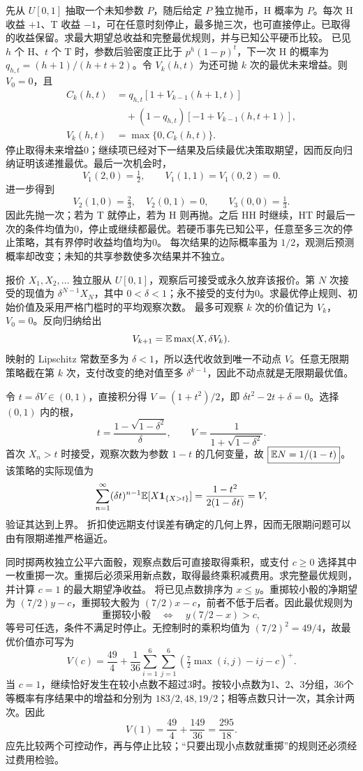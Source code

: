 先从 $U[0,1]$ 抽取一个未知参数 $P$，随后给定 $P$ 独立抛币，H 概率为 $P$。每次 H 收益 $+1$、T 收益 $-1$，可在任意时刻停止，最多抛三次，也可直接停止。已取得的收益保留。求最大期望总收益和完整最优规则，并与已知公平硬币比较。
\solution 已见 $h$ 个 H、$t$ 个 T 时，参数后验密度正比于 $p^h(1-p)^t$，下一次 H 的概率为 $q_{h,t}=(h+1)/(h+t+2)$。令 $V_k(h,t)$ 为还可抛 $k$ 次的最优未来增益。则 $V_0=0$，且
\[
 \begin{aligned}
 C_k(h,t)&=q_{h,t}[1+V_{k-1}(h+1,t)]\\
 &\quad +(1-q_{h,t})[-1+V_{k-1}(h,t+1)],\\
 V_k(h,t)&=\max\{0,C_k(h,t)\}.
 \end{aligned}
\]
停止取得未来增益0；继续项已经对下一结果及后续最优决策取期望，因而反向归纳证明该递推最优。最后一次机会时，
\[
 V_1(2,0)=\tfrac12,\qquad V_1(1,1)=V_1(0,2)=0.
\]
进一步得到
\[
 V_2(1,0)=\tfrac23,\quad V_2(0,1)=0,\qquad
 \boxed{V_3(0,0)=\tfrac13}.
\]
因此先抛一次；若为 T 就停止，若为 H 则再抛。之后 HH 时继续，HT 时最后一次的条件均值为0，停止或继续都最优。若硬币事先已知公平，任意至多三次的停止策略，其有界停时收益均值均为0。
\insight 每次结果的边际概率虽为 $1/2$，观测后预测概率却改变；未知的共享参数使多次结果并不独立。

报价 $X_1,X_2,\ldots$ 独立服从 $U[0,1]$，观察后可接受或永久放弃该报价。第 $N$ 次接受的现值为 $\delta^{N-1}X_N$，其中 $0<\delta<1$；永不接受的支付为0。求最优停止规则、初始价值及采用严格门槛时的平均观察次数。
\solution 最多可观察 $k$ 次的价值记为 $V_k$，$V_0=0$。反向归纳给出
\[
 V_{k+1}=\mathbb{E}\max(X,\delta V_k).
\]
映射的 Lipschitz 常数至多为 $\delta<1$，所以迭代收敛到唯一不动点 $V$。任意无限期策略截在第 $k$ 次，支付改变的绝对值至多 $\delta^{k-1}$，因此不动点就是无限期最优值。

令 $t=\delta V\in(0,1)$，直接积分得 $V=(1+t^2)/2$，即 $\delta t^2-2t+\delta=0$。选择 $(0,1)$ 内的根，
\[
 \boxed{t=\frac{1-\sqrt{1-\delta^2}}\delta},\qquad
 \boxed{V=\frac1{1+\sqrt{1-\delta^2}}}.
\]
首次 $X_n>t$ 时接受，观察次数为参数 $1-t$ 的几何变量，故 $\boxed{\mathbb{E} N=1/(1-t)}$。该策略的实际现值为
\[
 \sum_{n=1}^\infty(\delta t)^{n-1}\mathbb{E}[X\mathbf{1}_{\{X>t\}}]
 =\frac{1-t^2}{2(1-\delta t)}=V,
\]
验证其达到上界。
\insight 折扣使远期支付误差有确定的几何上界，因而无限期问题可以由有限期递推严格逼近。

同时掷两枚独立公平六面骰，观察点数后可直接取得乘积，或支付 $c\ge0$ 选择其中一枚重掷一次。重掷后必须采用新点数，取得最终乘积减费用。求完整最优规则，并计算 $c=1$ 的最大期望净收益。
\solution 将已见点数排序为 $x\le y$。重掷较小骰的净期望为 $(7/2)y-c$，重掷较大骰为 $(7/2)x-c$，前者不低于后者。因此最优规则为
\[
 \boxed{\text{重掷较小骰}\quad\Longleftrightarrow\quad
 y(7/2-x)>c},
\]
等号可任选，条件不满足时停止。无控制时的乘积均值为 $(7/2)^2=49/4$，故最优价值亦可写为
\[
 V(c)=\frac{49}{4}+\frac1{36}\sum_{i=1}^6\sum_{j=1}^6
 \left(\tfrac72\max(i,j)-ij-c\right)^+.
\]
当 $c=1$，继续恰好发生在较小点数不超过3时。按较小点数为1、2、3分组，36个等概率有序结果中的增益和分别为 $183/2,48,19/2$；相等点数只计一次，其余计两次。因此
\[
 \boxed{V(1)=\frac{49}{4}+\frac{149}{36}=\frac{295}{18}}.
\]
\insight 应先比较两个可控动作，再与停止比较；“只要出现小点数就重掷”的规则还必须经过费用检验。

